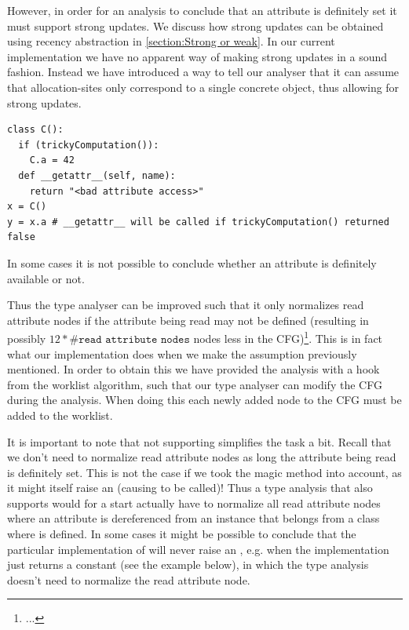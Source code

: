 However, in order for an analysis to conclude that an attribute is definitely set it must support strong updates. We discuss how strong updates can be obtained using recency abstraction in \autoref{section:Strong or weak}. In our current implementation we have no apparent way of making strong updates in a sound fashion. Instead we have introduced a way to tell our analyser that it can assume that allocation-sites only correspond to a single concrete object, thus allowing for strong updates.

\begin{listing}[H]
  \begin{verbatim}
class C():
  if (trickyComputation()):
    C.a = 42
  def __getattr__(self, name):
    return "<bad attribute access>"
x = C()
y = x.a # __getattr__ will be called if trickyComputation() returned false
  \end{verbatim}
  \caption{In some cases it is not possible to conclude whether an attribute is definitely available or not.}
  \label{ex:DefinitelyAvailable}
\end{listing}

Thus the type analyser can be improved such that it only normalizes read attribute nodes if the attribute being read may not be defined (resulting in possibly $12 * \#\texttt{read attribute nodes}$ nodes less in the CFG)\footnote{...}. This is in fact what our implementation does when we make the assumption previously mentioned. In order to obtain this we have provided the analysis with a hook from the worklist algorithm, such that our type analyser can modify the CFG during the analysis. When doing this each newly added node to the CFG must be added to the worklist.

It is important to note that not supporting  simplifies the task a bit. Recall that we don't need to normalize read attribute nodes as long the attribute being read is definitely set. This is not the case if we took the magic method  into account, as it might itself raise an  (causing  to be called)! Thus a type analysis that also supports  would for a start actually have to normalize all read attribute nodes where an attribute is dereferenced from an instance that belongs from a class where  is defined. In some cases it might be possible to conclude that the particular implementation of  will never raise an , e.g. when the implementation just returns a constant (see the example below), in which the type analysis doesn't need to normalize the read attribute node.

